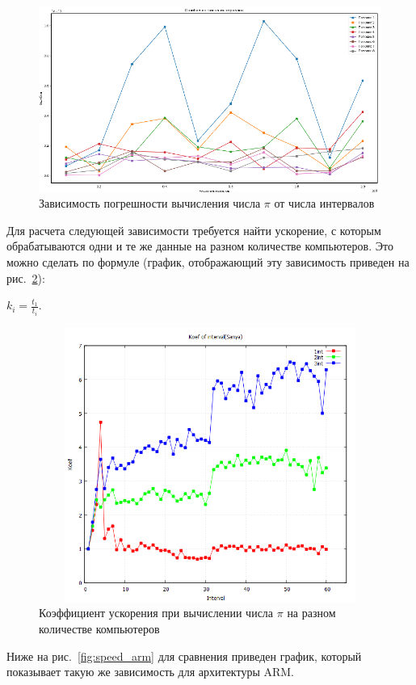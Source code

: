 \documentclass{altsu-bachelor}
\begin{document}
\begin{figure}[H]
    \centering
    \includegraphics[scale=0.8]{images/errors.png}
    \caption{Зависимость погрешности вычисления числа $\pi$ от числа интервалов}
    \label{fig:error}
\end{figure}

Для расчета следующей зависимости требуется найти ускорение, с которым обрабатываются одни и те же данные на разном количестве компьютеров. Это можно сделать по формуле (график, отображающий эту зависимость приведен на рис.~\ref{fig:speed}):

$k_i = \frac{t_1}{t_i}$.

\begin{figure}[H]
    \centering
    \includegraphics[width=170mm, height=90mm]{images/coeff.png}
    \caption{\centering Коэффициент ускорения при вычислении числа $\pi$ на разном количестве компьютеров}
    \label{fig:speed}
\end{figure}

Ниже на рис.~\ref{fig:speed_arm} для сравнения приведен график, который показывает такую же зависимость для архитектуры ARM.
\end{document}
